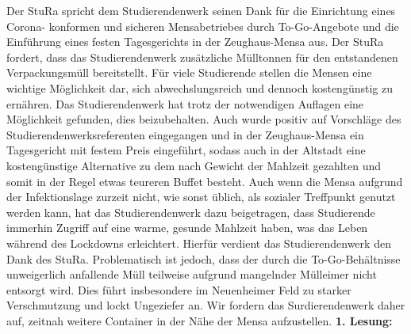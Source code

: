     {
        Der StuRa spricht dem Studierendenwerk seinen Dank für die Einrichtung eines Corona-
        konformen
        und sicheren Mensabetriebes durch To-Go-Angebote und die Einführung eines festen
        Tagesgerichts
        in der Zeughaus-Mensa aus.
        Der StuRa fordert, dass das Studierendenwerk zusätzliche Mülltonnen für den
        entstandenen
        Verpackungsmüll bereitstellt.
    }{
        Für viele Studierende stellen die Mensen eine wichtige Möglichkeit dar, sich abwechslungsreich
        und dennoch kostengünstig zu ernähren. Das Studierendenwerk hat trotz der notwendigen Auflagen
        eine Möglichkeit gefunden, dies beizubehalten. Auch wurde positiv auf Vorschläge des
        Studierendenwerksreferenten eingegangen und in der Zeughaus-Mensa ein Tagesgericht mit festem
        Preis eingeführt, sodass auch in der Altstadt eine kostengünstige Alternative zu dem nach Gewicht
        der Mahlzeit gezahlten und somit in der Regel etwas teureren Buffet besteht.
        Auch wenn die Mensa aufgrund der Infektionslage zurzeit nicht, wie sonst üblich, als sozialer
        Treffpunkt genutzt werden kann, hat das Studierendenwerk dazu beigetragen, dass Studierende
        immerhin Zugriff auf eine warme, gesunde Mahlzeit haben, was das Leben während des
        Lockdowns erleichtert. Hierfür verdient das Studierendenwerk den Dank des StuRa.
        Problematisch ist jedoch, dass der durch die To-Go-Behältnisse unweigerlich anfallende Müll
        teilweise aufgrund mangelnder Mülleimer nicht entsorgt wird. Dies führt insbesondere im 
        Neuenheimer Feld zu starker Verschmutzung und lockt Ungeziefer an. Wir fordern das
        Surdierendenwerk daher auf, zeitnah weitere Container in der Nähe der Mensa aufzustellen.
    }{
        \textbf{1. Lesung:}
        \ul{}
    }{
    }
